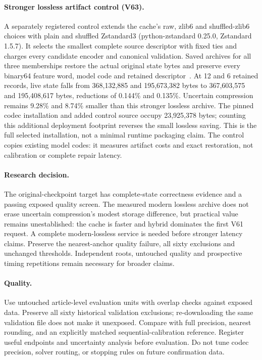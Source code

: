 \documentclass[10pt,twocolumn,letterpaper]{article}
\begin{document}
\paragraph{Stronger lossless artifact control (V63).}
A separately registered control extends the cache's raw, zlib6 and shuffled-zlib6
choices with plain and shuffled Zstandard3 (python-zstandard 0.25.0, Zstandard
1.5.7). It selects the smallest complete source descriptor with fixed ties and
charges every candidate encoder and canonical validation. Saved archives for all
three memberships restore the actual original state bytes and preserve every
binary64 feature word, model code and retained descriptor~\cite{v63terminal}.
At 12 and 6 retained records, live state falls from 368,132,885 and 195,673,382
bytes to 367,603,575 and 195,408,617 bytes, reductions of 0.144\% and 0.135\%.
Uncertain compression remains 9.28\% and 8.74\% smaller than this stronger
lossless archive. The pinned codec installation and added control source occupy
23,925,378 bytes; counting this additional deployment footprint reverses the
small lossless saving. This is the full selected installation, not a minimal
runtime packaging claim. The control copies existing model codes: it measures
artifact costs and exact restoration, not calibration or complete repair latency.

\paragraph{Research decision.}
The original-checkpoint target has complete-state correctness evidence and a
passing exposed quality screen. The measured modern lossless archive does not
erase uncertain compression's modest storage difference, but practical value
remains unestablished: the cache is faster and hybrid dominates the first V61
request. A complete modern-lossless service is needed before stronger latency
claims. Preserve the nearest-anchor quality failure, all sixty exclusions and
unchanged thresholds. Independent roots, untouched quality and prospective
timing repetitions remain necessary for broader claims.

\paragraph{Quality.}
Use untouched article-level evaluation units with overlap checks against exposed
data. Preserve all sixty historical validation exclusions; re-downloading the
same validation file does not make it unexposed. Compare with full precision,
nearest rounding, and an explicitly matched sequential-calibration reference.
Register useful endpoints and uncertainty analysis before evaluation. Do not tune
codec precision, solver routing, or stopping rules on future confirmation data.
\end{document}
